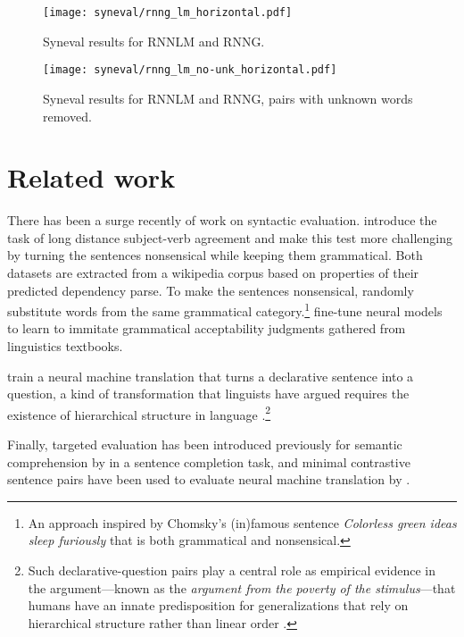     \begin{figure}[h]
      \center
      \texttt{[image: syneval/rnng\_lm\_horizontal.pdf]}
    \caption{Syneval results for RNNLM and RNNG.}
    \label{fig:syneval-lm-rnng}
    \end{figure}

    \begin{figure}[h]
      \center
      \texttt{[image: syneval/rnng\_lm\_no-unk\_horizontal.pdf]}
    \caption{Syneval results for RNNLM and RNNG, pairs with unknown words removed.}
    \label{fig:syneval-lm-rnng-nounk}
    \end{figure}

\section{Related work}
  There has been a surge recently of work on syntactic evaluation. \citet{linzen2016syntax} introduce the task of long distance subject-verb agreement and \citet{gulordava2018colorless} make this test more challenging by turning the sentences nonsensical while keeping them grammatical. Both datasets are extracted from a wikipedia corpus based on properties of their predicted dependency parse. To make the sentences nonsensical, \citet{gulordava2018colorless} randomly substitute words from the same grammatical category.\footnote{An approach inspired by Chomsky's (in)famous sentence \textit{Colorless green ideas sleep furiously} that is both grammatical and nonsensical.} \citet{warstadt2018acceptability} fine-tune neural models to learn to immitate grammatical acceptability judgments gathered from linguistics textbooks.

  \citet{mccoy2018revisiting} train a neural machine translation that turns a declarative sentence into a question, a kind of transformation that linguists have argued requires the existence of hierarchical structure in language \citep{everaert2015structures}.\footnote{Such declarative-question pairs play a central role as empirical evidence in the argument---known as the \textit{argument from the poverty of the stimulus}---that humans have an innate predisposition for generalizations that rely on hierarchical structure rather than linear order \citep{chomsky1980rules}.}

  Finally, targeted evaluation has been introduced previously for semantic comprehension by \citet{zweig2011microsoft} in a sentence completion task, and minimal contrastive sentence pairs have been used to evaluate neural machine translation by \citet{sennrich2017grammatical}.
